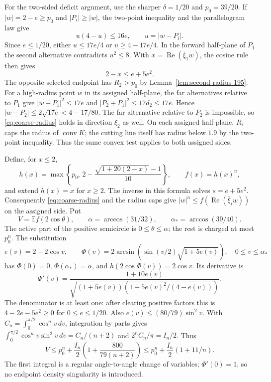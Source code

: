 \documentclass[11pt]{article}
\newcommand{\E}{\mathbb E}
\begin{document}
	For the two-sided deficit argument, use the sharper
	$\delta=1/20$ and $p_0=39/20$.  If $|w|=2-e\geq p_0$
	and $|P_i|\geq|w|$, the two-point inequality and the
	parallelogram law give
	\[
	u(4-u)\leq16e,\qquad u=|w-P_i|.
	\]
	Since $e\leq1/20$, either $u\leq17e/4$ or
	$u\geq4-17e/4$.  In the forward half-plane of $P_1$
	the second alternative contradicts $u^2\leq8$.
	With $x=\operatorname{Re}(\bar\xi_1w)$, the cosine rule then gives
	\begin{equation}\label{eq:coarse-radius}
		2-x\leq e+5e^2.
	\end{equation}
	The opposite selected endpoint has $R_2>p_0$ by
	Lemma~\ref{lem:second-radius-195}.  For a high-radius point $w$
	in its assigned half-plane, the far alternatives relative to $P_1$
	give $|w+P_1|^2\leq17e$ and
	$|P_2+P_1|^2\leq17d_2\leq17e$.  Hence
	$|w-P_2|\leq2\sqrt{17e}<4-17/80$.
	The far alternative relative to $P_2$ is impossible, so
	\eqref{eq:coarse-radius} holds in direction $\xi_2$ as well.
	On each assigned half-plane, $R_i$ caps the radius of
	$\operatorname{conv}K$; the cutting line itself has radius below
	$1.9$ by the two-point inequality.  Thus the same convex test
	applies to both assigned sides.
	
	Define, for $x\leq2$,
	\[
	h(x)=\max\left\{p_0,\,
	2-\frac{\sqrt{1+20(2-x)}-1}{10}\right\},
	\qquad f(x)=h(x)^n,
	\]
	and extend $h(x)=x$ for $x\geq2$.  The inverse in this
	formula solves $s=e+5e^2$.  Consequently \eqref{eq:coarse-radius}
	and the radius caps give $|w|^n\leq f(\operatorname{Re}
	(\bar\xi_iw))$ on the assigned side.  Put
	\[
	V=\E f(2\cos\theta),\qquad
	\alpha=\arccos(31/32),\qquad
	\alpha_*=\arccos(39/40).
	\]
	The active part of the positive semicircle is $0\leq\theta\leq\alpha$;
	the rest is charged at most $p_0^n$.  The substitution
	\[
	e(v)=2-2\cos v,\qquad
	\Phi(v)=2\arcsin\!\left(\sin(v/2)\sqrt{1+5e(v)}\right),
	\quad 0\leq v\leq\alpha_*
	\]
	has $\Phi(0)=0$, $\Phi(\alpha_*)=\alpha$, and
	$h(2\cos\Phi(v))=2\cos v$.  Its derivative is
	\[
	\Phi'(v)=
	\frac{1+10e(v)}
	{\sqrt{(1+5e(v))(1-5e(v)^2/(4-e(v)))}}.
	\]
	The denominator is at least one: after clearing positive factors
	this is $4-2e-5e^2\geq0$ for $0\leq e\leq1/20$.
	Also $e(v)\leq(80/79)\sin^2v$.  With
	$C_n=\int_0^{\pi/2}\cos^n v\,dv$,
	integration by parts gives
	$\int_0^{\pi/2}\cos^n v\sin^2v\,dv=C_n/(n+2)$
	and $2^n C_n/\pi=I_n/2$.  Thus
	\begin{equation}\label{eq:coarse-model}
		V\leq p_0^n+\frac{I_n}{2}
		\left(1+\frac{800}{79(n+2)}\right)
		\leq p_0^n+\frac{I_n}{2}(1+11/n).
	\end{equation}
	The first integral is a regular angle-to-angle change of variables;
	$\Phi'(0)=1$, so no endpoint density singularity is introduced.
	
\end{document}
